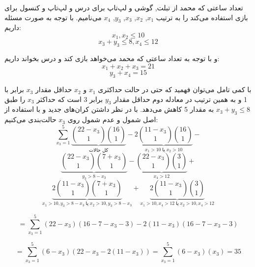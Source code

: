     \p
	تعداد ساعتی که محمد از تبلت, گوشی و لپ‌تاپ برای درس و لپ‌تاپ و کنسول برای بازی استفاده می‌کند را به ترتیب $x_1$, $x_2$, $x_3$, $y_3$, $x_4$ می‌نامیم.
    با توجه به صورت مسئله داریم:
    $$x_1, x_2 \leq 10$$
    $$x_3 + y_3 \leq 8 , x_4 \leq 12$$
    
    \p
    و با توجه به تعداد ساعتی که محمد می‌خواهد بازی کند و درس بخواند داریم:
    $$x_1 + x_2 + x_3 = 21$$
    $$y_3 + x_4 = 15$$
    
    \p
    با کمی تامل می‌توان فهمید که حتی در حالت حداکثری $x_1$ و $x_2$ حداقل مقدار $x_3$ برابر با  1 و به همین ترتیب در معادله دوم حداقل مقدار $y_3$ برابر 3 است که حداکثر $x_3$ را طبق $x_3 + y_3 \leq 8$ به مقدار 5 کاهش می‌دهد. با در نظر داشتن کران‌های جدید و با استفاده از اصل شمول و عدم شمول روی $x_3$ حالت‌بندی می‌کنیم:
    $$\sum\limits_{x_3 = 1}^5 \underbrace{{22 - x_3 \choose 1}{16 \choose 1}}_{\text{کل حالات}} - \underbrace{2{11 - x_3 \choose 1}{16 \choose 1}}_{x_1 > 10 \; \text{یا} \; x_2 > 10} - $$
    $$\underbrace{{22 - x_3 \choose 1}{7 + x_3 \choose 1}}_{y_3 > 8 - x_3} - \underbrace{{22 - x_3 \choose 1}{3 \choose 1}}_{x_4 > 12} + $$
    $$\underbrace{2{11 - x_3 \choose 1}{7 + x_3 \choose 1}}_{x_1 > 10, y_3 > 8 - x_3 \; \text{یا} \; x_2 > 10, y_3 > 8 - x_3} + \underbrace{2{11 - x_3 \choose 1}{3 \choose 1}}_{x_1 > 10, x_4 > 12 \; \text{یا} \; x_2 > 10, x_4 > 12}$$
    
    $$= \sum\limits_{x_3 = 1}^5 (22 - x_3)(16 - 7 - x_3 - 3) - 2(11 - x_3)(16 - 7 - x_3 - 3)$$
    
    $$= \sum\limits_{x_3 = 1}^5 (6 - x_3)(22 - x_3 - 2(11 - x_3)) = \sum\limits_{x_3 = 1}^5 (6 - x_3)(x_3) = 35$$
